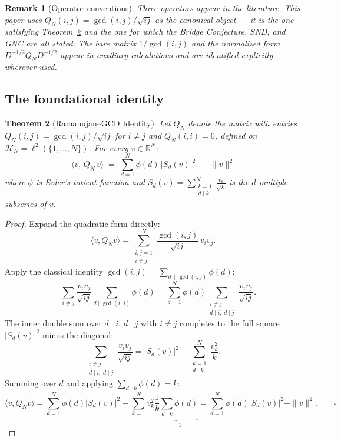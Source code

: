 \documentclass[12pt]{article}
\newtheorem{theorem}{Theorem}
\newtheorem{remark}[theorem]{Remark}
\begin{document}
\begin{remark}[Operator conventions]
Three operators appear in the literature.
This paper uses $Q_N(i,j)=\gcd(i,j)/\sqrt{ij}$ as the canonical object
— it is the one satisfying Theorem~\ref{thm:ramanujan-gcd} and the one
for which the Bridge Conjecture, SND, and GNC are all stated.
The bare matrix $1/\gcd(i,j)$ and the normalized form
$D^{-1/2}Q_N D^{-1/2}$ appear in auxiliary calculations and are
identified explicitly wherever used.
\end{remark}

\subsection{The foundational identity}
\label{subsec:theorem1}

\begin{theorem}[Ramanujan--GCD Identity]
\label{thm:ramanujan-gcd}
Let $Q_N$ denote the matrix with entries
$Q_N(i,j) = \gcd(i,j)/\sqrt{ij}$ for $i \ne j$ and $Q_N(i,i) = 0$,
defined on $\mathcal{H}_N = \ell^2(\{1,\ldots,N\})$.
For every $v \in \mathbb{R}^N$:
\[
  \boxed{
  \langle v,\, Q_N\, v\rangle
  \;=\; \sum_{d=1}^N \phi(d)\,\bigl|S_d(v)\bigr|^2 \;-\; \|v\|^2
  }
\]
where $\phi$ is Euler's totient function and
$S_d(v) = \displaystyle\sum_{\substack{k=1 \\ d\mid k}}^{N}
           \frac{v_k}{\sqrt{k}}$
is the $d$-multiple subseries of $v$.
\end{theorem}

\begin{proof}
Expand the quadratic form directly:
\[
  \langle v, Q_N v\rangle
  = \sum_{\substack{i,j=1\\i\ne j}}^N
    \frac{\gcd(i,j)}{\sqrt{ij}}\,v_i v_j.
\]
Apply the classical identity $\gcd(i,j) = \sum_{d\,\mid\,\gcd(i,j)}\phi(d)$:
\[
  = \sum_{i\ne j}\frac{v_i v_j}{\sqrt{ij}}
    \sum_{d\mid\gcd(i,j)}\phi(d)
  = \sum_{d=1}^N \phi(d)
    \sum_{\substack{i\ne j\\d\mid i,\;d\mid j}}
    \frac{v_i v_j}{\sqrt{ij}}.
\]
The inner double sum over $d\mid i$, $d\mid j$ with $i\ne j$ completes
to the full square $|S_d(v)|^2$ minus the diagonal:
\[
  \sum_{\substack{i\ne j\\d\mid i,\;d\mid j}}\frac{v_i v_j}{\sqrt{ij}}
  = |S_d(v)|^2 - \sum_{\substack{k=1\\d\mid k}}^N \frac{v_k^2}{k}.
\]
Summing over $d$ and applying $\sum_{d\mid k}\phi(d) = k$:
\[
  \langle v,Q_N v\rangle
  = \sum_{d=1}^N\phi(d)|S_d(v)|^2
    - \sum_{k=1}^N v_k^2 \underbrace{\frac{1}{k}\sum_{d\mid k}\phi(d)}_{=1}
  = \sum_{d=1}^N\phi(d)|S_d(v)|^2 - \|v\|^2. \qquad\square
\]
\end{proof}
\end{document}
